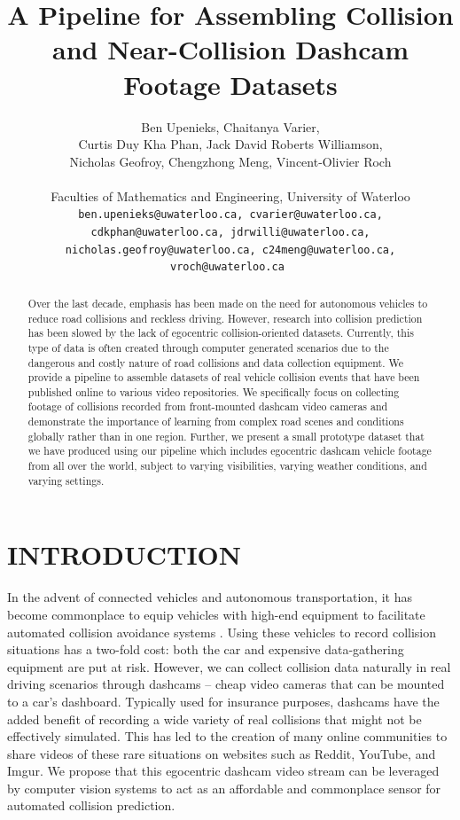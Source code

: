 \documentclass[letterpaper, 10 pt, conference]{ieeeconf}
\title{\LARGE \bf
A Pipeline for Assembling Collision and Near-Collision Dashcam Footage Datasets
}
\author{
         Ben Upenieks, Chaitanya Varier,\\
         Curtis Duy Kha Phan, Jack David Roberts Williamson,\\
         Nicholas Geofroy, Chengzhong Meng, Vincent-Olivier Roch\\
         \\
         Faculties of Mathematics and Engineering, University of Waterloo\\
         \tt\small ben.upenieks@uwaterloo.ca, cvarier@uwaterloo.ca,
         \\ \tt\small cdkphan@uwaterloo.ca, jdrwilli@uwaterloo.ca,
         \\ \tt\small nicholas.geofroy@uwaterloo.ca, c24meng@uwaterloo.ca, vroch@uwaterloo.ca
}
\begin{document}
\maketitle
\thispagestyle{empty}
\pagestyle{empty}


\begin{abstract}

Over the last decade, emphasis has been made on the need for autonomous vehicles to reduce road collisions and reckless driving. However, research into collision prediction has been slowed by the lack of egocentric collision-oriented datasets. Currently, this type of data is often created through computer generated scenarios \cite{Kim_Lee_Hwang_Suh_2019} due to the dangerous and costly nature of road collisions and data collection equipment. We provide a pipeline to assemble datasets of real vehicle collision events that have been published online to various video repositories. We specifically focus on collecting footage of collisions recorded from front-mounted dashcam video cameras and demonstrate the importance of learning from complex road scenes and conditions globally rather than in one region. Further, we present a small prototype dataset that we have produced using our pipeline which includes egocentric dashcam vehicle footage from all over the world, subject to varying visibilities, varying weather conditions, and varying settings.

\end{abstract}

\section{INTRODUCTION}

In the advent of connected vehicles and autonomous transportation, it has become commonplace to equip vehicles with high-end equipment to facilitate automated collision avoidance systems \cite{Perumal2020LidarBI}.
Using these vehicles to record collision situations has a two-fold cost: both the car and expensive data-gathering equipment are put at risk.
However, we can collect collision data naturally in real driving scenarios through dashcams -- cheap video cameras that can be mounted to a car's dashboard.
Typically used for insurance purposes, dashcams have the added benefit of recording a wide variety of real collisions that might not be effectively simulated. 
This has led to the creation of many online communities to share videos of these rare situations on websites such as Reddit, YouTube, and Imgur.
We propose that this egocentric dashcam video stream can be leveraged by computer vision systems to act as an affordable and commonplace sensor for automated collision prediction. 
\end{document}
